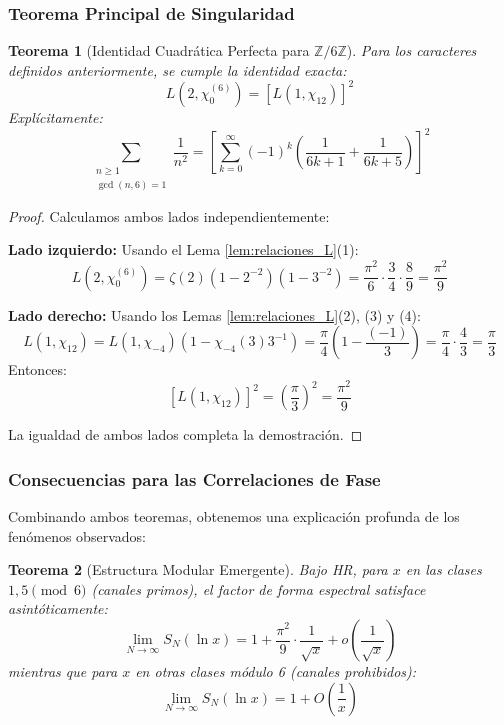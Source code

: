 \documentclass[12pt, a4paper]{article}
\theoremstyle{plain}
\newtheorem{teorema}{Teorema}[section]
\theoremstyle{definition}
\begin{document}
\subsubsection{Teorema Principal de Singularidad}

\begin{teorema}[Identidad Cuadrática Perfecta para $\mathbb{Z}/6\mathbb{Z}$]
\label{teo:identidad_cuadratica}
Para los caracteres definidos anteriormente, se cumple la identidad exacta:
\[
L(2,\chi_0^{(6)}) = [L(1,\chi_{12})]^2
\]
Explícitamente:
\[
\sum_{\substack{n \geq 1 \\ \gcd(n,6)=1}} \frac{1}{n^2} = \left[ \sum_{k=0}^\infty (-1)^k \left( \frac{1}{6k+1} + \frac{1}{6k+5} \right) \right]^2
\]
\end{teorema}

\begin{proof}
Calculamos ambos lados independientemente:

\textbf{Lado izquierdo:} Usando el Lema \ref{lem:relaciones_L}(1):
\[
L(2,\chi_0^{(6)}) = \zeta(2)(1-2^{-2})(1-3^{-2}) = \frac{\pi^2}{6} \cdot \frac{3}{4} \cdot \frac{8}{9} = \frac{\pi^2}{9}
\]

\textbf{Lado derecho:} Usando los Lemas \ref{lem:relaciones_L}(2), (3) y (4):
\[
L(1,\chi_{12}) = L(1,\chi_{-4})(1 - \chi_{-4}(3)3^{-1}) = \frac{\pi}{4} \left(1 - \frac{(-1)}{3}\right) = \frac{\pi}{4} \cdot \frac{4}{3} = \frac{\pi}{3}
\]
Entonces:
\[
[L(1,\chi_{12})]^2 = \left(\frac{\pi}{3}\right)^2 = \frac{\pi^2}{9}
\]

La igualdad de ambos lados completa la demostración.
\end{proof}

\subsubsection{Consecuencias para las Correlaciones de Fase}

Combinando ambos teoremas, obtenemos una explicación profunda de los fenómenos observados:

\begin{teorema}[Estructura Modular Emergente]
\label{teo:estructura_modular}
Bajo HR, para $x$ en las clases $1,5 \pmod{6}$ (canales primos), el factor de forma espectral satisface asintóticamente:
\[
\lim_{N \to \infty} S_N(\ln x) = 1 + \frac{\pi^2}{9} \cdot \frac{1}{\sqrt{x}} + o\left(\frac{1}{\sqrt{x}}\right)
\]
mientras que para $x$ en otras clases módulo 6 (canales prohibidos):
\[
\lim_{N \to \infty} S_N(\ln x) = 1 + O\left(\frac{1}{x}\right)
\]
\end{teorema}
\end{document}
